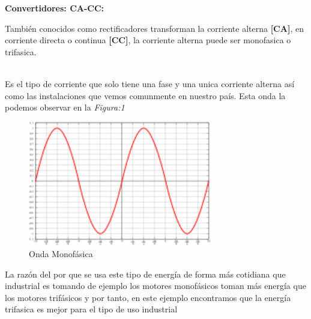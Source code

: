 \documentclass[a3paper,12pt]{article}
\begin{document}
{
\begin{flushleft}






















{\color{cyan}\huge{\textbf{Convertidores: CA-CC:}}}\\
	\vspace{.3cm}
		{\LARGE También conocidos como rectificadores transforman la corriente alterna \textbf{[CA]}, en corriente directa o continua \textbf{[CC]}, la corriente alterna puede ser monofasica o trifasica.\vspace{1cm}
		
			\\

			{Es el tipo de corriente que solo tiene una fase y una unica 					corriente alterna así como las instalaciones que vemos comunmente en nuestro 					país. Esta onda la podemos observar en la \textit{Figura:1} \\}
			\begin{figure}[hbtp]
			\centering
			\includegraphics[width=8cm]{mono.png}
			\caption{Onda Monofásica}
			\end{figure}
			La razón del por que se usa este tipo de energía de forma más cotidiana que industrial es tomando de ejemplo los motores monofásicos toman  más energía que los motores trifásicos y por tanto, en este ejemplo encontramos que la energía trifasica es mejor para el tipo de uso industrial
			
			\\

}
\end{flushleft}}
\end{document}

